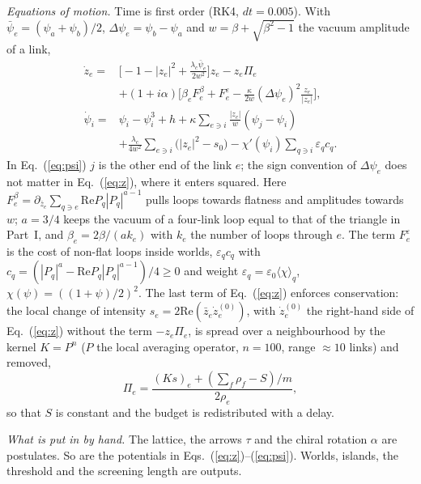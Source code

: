 \documentclass[reprint,pre,amsmath,amssymb,superscriptaddress,nofootinbib]{revtex4-2}
\newcommand{\sz}{s_0}
\begin{document}
\emph{Equations of motion.} Time is first order (RK4, $dt=0.005$). With $\bar\psi_e=(\psi_a+\psi_b)/2$, $\Delta\psi_e=\psi_b-\psi_a$ and $w=\beta+\sqrt{\beta^2-1}$ the vacuum amplitude of a link,
\begin{align}
\dot z_e ={}& \Big[-1-|z_e|^2+\frac{\lambda_c\bar\psi_e}{2w^2}\Big]z_e-z_e\Pi_e \nonumber\\
&+(1+i\alpha)\Big[\beta_e F^{\beta}_e+F^{\varepsilon}_e-\frac{\kappa}{2w}(\Delta\psi_e)^2\frac{z_e}{|z_e|}\Big], \label{eq:z}\\
\dot\psi_i ={}& \psi_i-\psi_i^3+h+\kappa\sum_{e\ni i}\frac{|z_e|}{w}(\psi_j-\psi_i) \nonumber\\
&+\frac{\lambda_c}{4w^2}\sum_{e\ni i}\big(|z_e|^2-\sz\big)-\chi'(\psi_i)\sum_{q\ni i}\varepsilon_q c_q. \label{eq:psi}
\end{align}
In Eq.~(\ref{eq:psi}) $j$ is the other end of the link $e$; the sign convention of $\Delta\psi_e$ does not matter in Eq.~(\ref{eq:z}), where it enters squared.
Here $F^\beta_e=\partial_{\bar z_e}\sum_{q\ni e}\mathrm{Re}P_q|P_q|^{a-1}$ pulls loops towards flatness and amplitudes towards $w$; $a=3/4$ keeps the vacuum of a four-link loop equal to that of the triangle in Part~I, and $\beta_e=2\beta/(a k_e)$ with $k_e$ the number of loops through $e$. The term $F^\varepsilon_e$ is the cost of non-flat loops inside worlds, $\varepsilon_q c_q$ with $c_q=(|P_q|^a-\mathrm{Re}P_q|P_q|^{a-1})/4\ge 0$ and weight $\varepsilon_q=\varepsilon_0\langle\chi\rangle_q$, $\chi(\psi)=((1+\psi)/2)^2$. The last term of Eq.~(\ref{eq:z}) enforces conservation: the local change of intensity $s_e=2\mathrm{Re}(\bar z_e\dot z^{(0)}_e)$, with $\dot z^{(0)}_e$ the right-hand side of Eq.~(\ref{eq:z}) without the term $-z_e\Pi_e$, is spread over a neighbourhood by the kernel $K=P^n$ ($P$ the local averaging operator, $n=100$, range $\approx 10$ links) and removed,
\begin{equation}
\Pi_e=\frac{(Ks)_e+(\sum_f\rho_f-S)/m}{2\rho_e},
\end{equation}
so that $S$ is constant and the budget is redistributed with a delay.

\emph{What is put in by hand.} The lattice, the arrows $\tau$ and the chiral rotation $\alpha$ are postulates. So are the potentials in Eqs.~(\ref{eq:z})--(\ref{eq:psi}). Worlds, islands, the threshold and the screening length are outputs.
\end{document}
